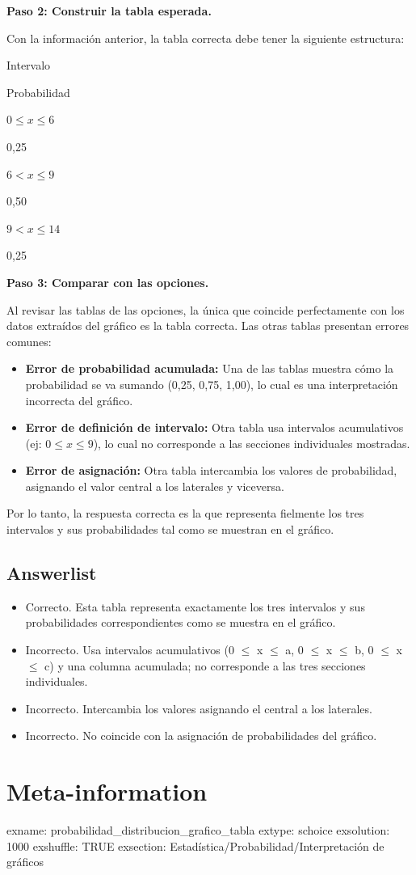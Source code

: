 \documentclass[
]{article}
\providecommand{\tightlist}{%
  \setlength{\itemsep}{0pt}\setlength{\parskip}{0pt}}
\begin{document}
\textbf{Paso 2: Construir la tabla esperada.}

Con la información anterior, la tabla correcta debe tener la siguiente
estructura:

Intervalo

Probabilidad

\(0 \le x \le 6\)

0,25

\(6 < x \le 9\)

0,50

\(9 < x \le 14\)

0,25

\textbf{Paso 3: Comparar con las opciones.}

Al revisar las tablas de las opciones, la única que coincide
perfectamente con los datos extraídos del gráfico es la tabla correcta.
Las otras tablas presentan errores comunes:

\begin{itemize}
\tightlist
\item
  \textbf{Error de probabilidad acumulada:} Una de las tablas muestra
  cómo la probabilidad se va sumando (0,25, 0,75, 1,00), lo cual es una
  interpretación incorrecta del gráfico.
\item
  \textbf{Error de definición de intervalo:} Otra tabla usa intervalos
  acumulativos (ej: \(0 \le x \le 9\)), lo cual no corresponde a las
  secciones individuales mostradas.
\item
  \textbf{Error de asignación:} Otra tabla intercambia los valores de
  probabilidad, asignando el valor central a los laterales y viceversa.
\end{itemize}

Por lo tanto, la respuesta correcta es la que representa fielmente los
tres intervalos y sus probabilidades tal como se muestran en el gráfico.

\subsection{Answerlist}\label{answerlist-1}

\begin{itemize}
\tightlist
\item
  Correcto. Esta tabla representa exactamente los tres intervalos y sus
  probabilidades correspondientes como se muestra en el gráfico.
\item
  Incorrecto. Usa intervalos acumulativos (0 \(\le\) x \(\le\) a, 0
  \(\le\) x \(\le\) b, 0 \(\le\) x \(\le\) c) y una columna acumulada;
  no corresponde a las tres secciones individuales.
\item
  Incorrecto. Intercambia los valores asignando el central a los
  laterales.
\item
  Incorrecto. No coincide con la asignación de probabilidades del
  gráfico.
\end{itemize}

\section{Meta-information}\label{meta-information}

exname: probabilidad\_distribucion\_grafico\_tabla extype: schoice
exsolution: 1000 exshuffle: TRUE exsection:
Estadística/Probabilidad/Interpretación de gráficos
\end{document}
